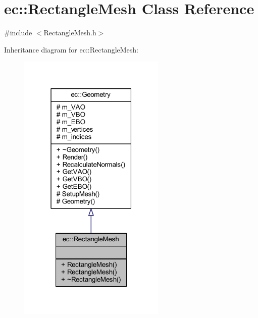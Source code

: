 \hypertarget{classec_1_1_rectangle_mesh}{}\section{ec\+:\+:Rectangle\+Mesh Class Reference}
\label{classec_1_1_rectangle_mesh}


{\ttfamily \#include $<$Rectangle\+Mesh.\+h$>$}



Inheritance diagram for ec\+:\+:Rectangle\+Mesh\+:\nopagebreak
\begin{figure}[H]
\begin{center}
\leavevmode
\includegraphics[width=199pt]{classec_1_1_rectangle_mesh__inherit__graph}
\end{center}
\end{figure}


